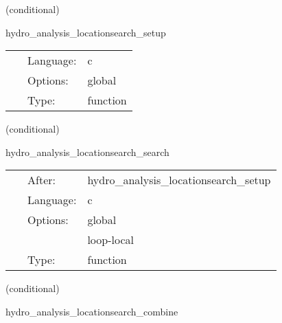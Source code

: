 \vspace{5mm}

   (conditional) 

\hspace{5mm} hydro\_analysis\_locationsearch\_setup 

\hspace{5mm}{\it prepare data structures for search } 


\hspace{5mm}

 \begin{tabular*}{160mm}{cll} 
~ & Language:  & c \\ 
~ & Options:  & global \\ 
~ & Type:  & function \\ 
\end{tabular*} 


\vspace{5mm}

   (conditional) 

\hspace{5mm} hydro\_analysis\_locationsearch\_search 

\hspace{5mm}{\it search for the location of the maximum density } 


\hspace{5mm}

 \begin{tabular*}{160mm}{cll} 
~ & After:  & hydro\_analysis\_locationsearch\_setup \\ 
~ & Language:  & c \\ 
~ & Options:  & global \\ 
~& ~ &loop-local\\ 
~ & Type:  & function \\ 
\end{tabular*} 


\vspace{5mm}

   (conditional) 

\hspace{5mm} hydro\_analysis\_locationsearch\_combine 

\hspace{5mm}{\it communicate and verify the location of the maximum density } 


\hspace{5mm}

